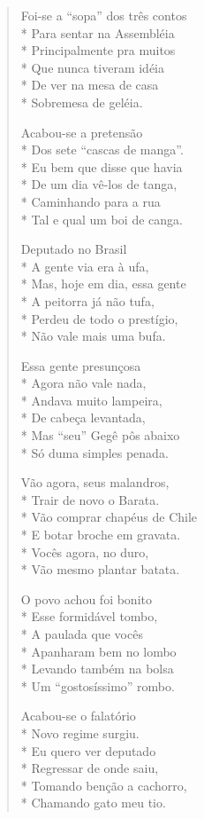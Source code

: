 \begin{verse}
Foi-se a “sopa” dos três contos\\*
Para sentar na Assembléia\\*
Principalmente pra muitos\\*
Que nunca tiveram idéia\\*
De ver na mesa de casa\\*
Sobremesa de geléia.

Acabou-se a pretensão\\*
Dos sete “cascas de manga”.\\*
Eu bem que disse que havia\\*
De um dia vê-los de tanga,\\*
Caminhando para a rua\\*
Tal e qual um boi de canga.

Deputado no Brasil\\*
A gente via era à ufa,\\*
Mas, hoje em dia, essa gente\\*
A peitorra já não tufa,\\*
Perdeu de todo o prestígio,\\*
Não vale mais uma bufa.

Essa gente presunçosa\\*
Agora não vale nada,\\*
Andava muito lampeira,\\*
De cabeça levantada,\\*
Mas “seu” Gegê pôs abaixo\\*
Só duma simples penada.

Vão agora, seus malandros,\\*
Trair de novo o Barata.\\*
Vão comprar chapéus de Chile\\*
E botar broche em gravata.\\*
Vocês agora, no duro,\\*
Vão mesmo plantar batata.

O povo achou foi bonito\\*
Esse formidável tombo,\\*
A paulada que vocês\\*
Apanharam bem no lombo\\*
Levando também na bolsa\\*
Um “gostosíssimo” rombo.

Acabou-se o falatório\\*
Novo regime surgiu.\\*
Eu quero ver deputado\\*
Regressar de onde saiu,\\*
Tomando benção a cachorro,\\*
Chamando gato meu tio.


\end{verse}
